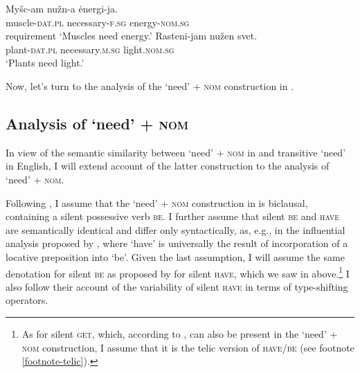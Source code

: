 \documentclass[output=paper,colorlinks,citecolor=brown]{langscibook}
\begin{document}
\ea \ea \label{nuzhen-muscles}\gll Myšc-am nužn-a ėnergi-ja. \\
muscle-\textsc{dat.pl} necessary-\textsc{f.sg} energy-\textsc{nom.sg}\\ \hfill requirement
\glt `Muscles need energy.'
\ex \label{nuzhen-plants}\gll Rasteni-jam nužen svet.\\
plant-\textsc{dat.pl} necessary.\textsc{m.sg} light.\textsc{nom.sg}\\
\glt `Plants need light.'
\z\z

\noindent Now, let's turn to the analysis of the `need' + \textsc{nom} construction in .

\subsection{Analysis of `need' + \textsc{nom}\label{section-nom-analysis}}

In view of the semantic similarity between `need' + \textsc{nom} in  and transitive `need' in English, I will extend  account of the latter construction to the analysis of `need' + \textsc{nom}.

Following \citet{Harves2008}, I assume that the `need' + \textsc{nom} construction in  is biclausal, containing a silent possessive verb \textsc{be}. I further assume that silent \textsc{be} and \textsc{have} are semantically identical and differ only syntactically, as, e.g., in the influential analysis proposed by \citet{Freeze1992}, where `have' is universally the result of incorporation of a locative preposition into `be'. Given the last assumption, I will assume the same denotation for silent \textsc{be} as proposed by \citet{Zaroukian.Beller2013} for silent \textsc{have}, which we saw in  above.\footnote{As for silent \textsc{get}, which, according to \citet{Harves2008}, can also be present in the `need' + \textsc{nom} construction, I assume that it is the telic version of \textsc{have}/\textsc{be} (see footnote \ref{footnote-telic}).} I also follow their account of the variability of silent \textsc{have} in terms of type-shifting operators.
\end{document}
